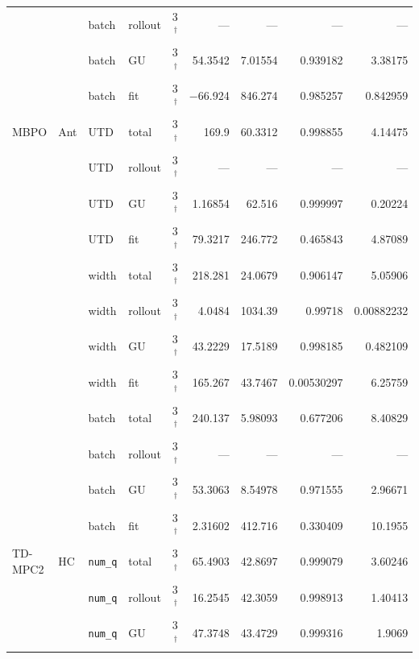 {\begin{longtable}{@{}llllrrrrr@{}}
     &  & batch & rollout & \num{3}$^{\dagger}$ & --- & --- & --- & --- \\
     &  & batch & GU & \num{3}$^{\dagger}$ & \num{54.3542} & \num{7.01554} & \num{0.939182} & \num{3.38175} \\
     &  & batch & fit & \num{3}$^{\dagger}$ & \num{-66.924} & \num{846.274} & \num{0.985257} & \num{0.842959} \\
    MBPO & Ant & UTD & total & \num{3}$^{\dagger}$ & \num{169.9} & \num{60.3312} & \num{0.998855} & \num{4.14475} \\
     &  & UTD & rollout & \num{3}$^{\dagger}$ & --- & --- & --- & --- \\
     &  & UTD & GU & \num{3}$^{\dagger}$ & \num{1.16854} & \num{62.516} & \num{0.999997} & \num{0.20224} \\
     &  & UTD & fit & \num{3}$^{\dagger}$ & \num{79.3217} & \num{246.772} & \num{0.465843} & \num{4.87089} \\
     &  & width & total & \num{3}$^{\dagger}$ & \num{218.281} & \num{24.0679} & \num{0.906147} & \num{5.05906} \\
     &  & width & rollout & \num{3}$^{\dagger}$ & \num{4.0484} & \num{1034.39} & \num{0.99718} & \num{0.00882232} \\
     &  & width & GU & \num{3}$^{\dagger}$ & \num{43.2229} & \num{17.5189} & \num{0.998185} & \num{0.482109} \\
     &  & width & fit & \num{3}$^{\dagger}$ & \num{165.267} & \num{43.7467} & \num{0.00530297} & \num{6.25759} \\
     &  & batch & total & \num{3}$^{\dagger}$ & \num{240.137} & \num{5.98093} & \num{0.677206} & \num{8.40829} \\
     &  & batch & rollout & \num{3}$^{\dagger}$ & --- & --- & --- & --- \\
     &  & batch & GU & \num{3}$^{\dagger}$ & \num{53.3063} & \num{8.54978} & \num{0.971555} & \num{2.96671} \\
     &  & batch & fit & \num{3}$^{\dagger}$ & \num{2.31602} & \num{412.716} & \num{0.330409} & \num{10.1955} \\
    \midrule
    TD-MPC2 & HC & \texttt{num\_q} & total & \num{3}$^{\dagger}$ & \num{65.4903} & \num{42.8697} & \num{0.999079} & \num{3.60246} \\
     &  & \texttt{num\_q} & rollout & \num{3}$^{\dagger}$ & \num{16.2545} & \num{42.3059} & \num{0.998913} & \num{1.40413} \\
     &  & \texttt{num\_q} & GU & \num{3}$^{\dagger}$ & \num{47.3748} & \num{43.4729} & \num{0.999316} & \num{1.9069} \\

\end{longtable}}
